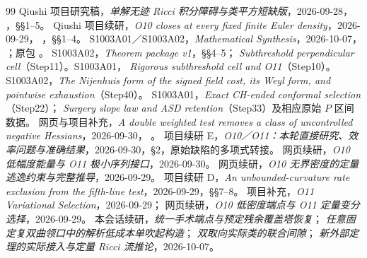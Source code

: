 \documentclass[UTF8,11pt,a4paper,fontset=none]{ctexart}
\numberwithin{equation}{section}
\theoremstyle{definition}
\theoremstyle{remark}\newtheorem{remark}[theorem]{说明}
\begin{document}
\begin{thebibliography}{99}\small
{} Qiushi 项目研究稿，\emph{单解无迹 Ricci 积分障碍与类平方短缺版}，2026-09-28，
，§§1--5。
 Qiushi 项目续研，\emph{O10 closes at every fixed finite Euler density}，2026-09-29，
，§§1--4。
 S1003A01／S1003A02，\emph{Mathematical Synthesis}，2026-10-07，
；原包
。
 S1003A02，\emph{Theorem package v1}，§§4--5；
\emph{Subthreshold perpendicular cell}（Step11）。S1003A01，
\emph{Rigorous subthreshold cell and O11}（Step10）。
 S1003A02，\emph{The Nijenhuis form of the signed field cost, its Weyl form, and pointwise exhaustion}（Step40）。
 S1003A01，\emph{Exact CH-ended conformal selection}（Step22）；
\emph{Surgery slope law and ASD retention}（Step33）及相应原始 $P$ 区间数据。
 网页与项目补充，\emph{A double weighted test removes a class of uncontrolled negative Hessians}，2026-09-30，
。
 项目续研 E，\emph{O10／O11：本轮直接研究、效率问题与准确结果}，2026-09-30，§2，原始缺陷的多项式转接。
 网页续研，\emph{O10 低幅度能量与 O11 极小序列接口}，2026-09-30。
 网页续研，\emph{O10 无界密度的定量逃逸约束与完整推导}，2026-09-29。
 项目续研 D，\emph{An unbounded-curvature rate exclusion from the fifth-line test}，2026-09-29，§§7--8。
 项目补充，\emph{O11 Variational Selection}，2026-09-29；
网页续研，\emph{O10 低密度端点与 O11 定量变分选择}，2026-09-29。
 本会话续研，\emph{统一手术端点与预定残余覆盖塔恢复}；
\emph{任意固定复双曲领口中的解析低成本单吹起构造}；
\emph{双取向实际类的联合间隙}；
\emph{新外部定理的实际接入与定量 Ricci 流推论}，2026-10-07。


\end{thebibliography}
\end{document}

